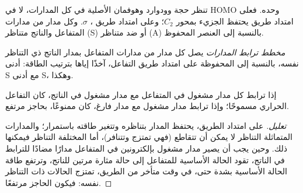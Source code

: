 تنظر حجة وودوارد وهوفمان الأصلية في كل المدارات، لا في
HOMO وحده. فعلى امتداد طريق  يحتفظ الجزيء بمحور $C_2$؛ وعلى امتداد
طريق ،  $\sigma$. وكل مدار من مدارات المتفاعل 
والناتج متناظر (S) أو ضد متناظر (A) بالنسبة إلى العنصر
المحفوظ.

\begin{definition}\label{def:b3:pericyclic:orbital-correlation}
\emph{مخطط ترابط المدارات} يصل
كل مدار من مدارات المتفاعل بمدار الناتج ذي التناظر نفسه،
بالنسبة إلى  المحفوظة على امتداد طريق التفاعل، آخذًا إياها
بترتيب الطاقة: أدنى S مع أدنى S، وهكذا.
\end{definition}

\begin{proposition}\label{prop:b3:pericyclic:correlation}
إذا ترابط كل مدار مشغول في المتفاعل مع مدار مشغول في
الناتج، كان التفاعل الحراري مسموحًا؛ وإذا ترابط مدار مشغول
مع مدار فارغ، كان ممنوعًا، بحاجز مرتفع.
\end{proposition}

\begin{proof}[تعليل]
على امتداد الطريق، يحتفظ المدار بتناظره وتتغير طاقته
باستمرار؛ والمدارات المتماثلة التناظر لا يمكن أن تتقاطع (فهي تمتزج وتتنافر)،
أما المختلفة التناظر فيمكنها ذلك. وحين يجب أن يصير مدار مشغول بإلكترونين في المتفاعل
مدارًا مضادًا للترابط في الناتج، تقود الحالة الأساسية
للمتفاعل إلى حالة مثارة مرتين للناتج، وترتفع طاقة الحالة الأساسية
بشدة حتى، في وقت متأخر من الطريق، تمتزج الحالات ذات التناظر نفسه:
فيكون الحاجز مرتفعًا.
\end{proof}

